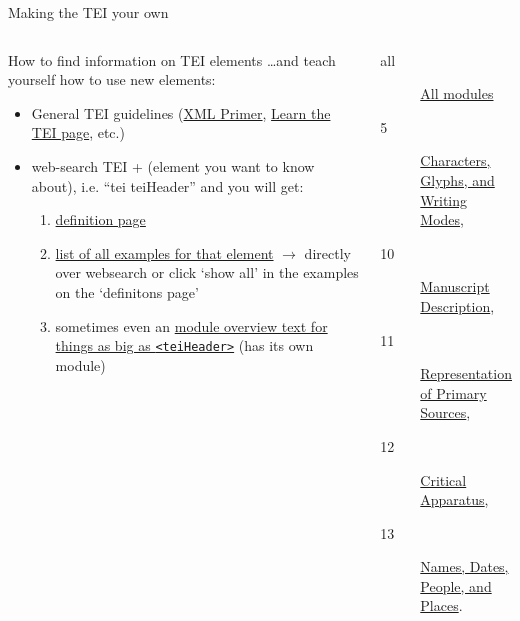 \begin{frame}{Making the TEI your own}
\small
{}

\begin{columns}
    \begin{block}{How to find information on TEI elements}
    \dots and teach yourself how to use new elements:
\begin{itemize}
    \item General TEI guidelines (\href{https://tei-c.org/release/doc/tei-p5-doc/en/html/SG.html}{XML Primer}, \href{https://tei-c.org/support/learn/}{Learn the TEI page}, etc.)
    \item web-search TEI + (element you want to know about), i.e. ``tei teiHeader'' and you will get:
    \begin{enumerate}\footnotesize
        \item \href{https://www.tei-c.org/release/doc/tei-p5-doc/en/html/ref-teiHeader.html}{definition page}
        \item \href{https://www.tei-c.org/release/doc/tei-p5-doc/en/html/examples-teiHeader.html}{list of all examples for that element} $\to$ directly over websearch or click `show all' in the examples on the `definitons page'
        \item sometimes even an \href{https://www.tei-c.org/release/doc/tei-p5-doc/en/html/HD.html}{module overview text for things as big as \texttt{<teiHeader>}} (has its own module)
    \end{enumerate}
\end{itemize}
    \end{block}



\begin{block}{}
\footnotesize
\begin{description}
    \item[all] \href{https://tei-c.org/release/doc/tei-p5-doc/en/html/index.html}{All modules}
     \item[5] \href{https://tei-c.org/release/doc/tei-p5-doc/en/html/WD.html}{Characters, Glyphs, and Writing Modes}, 
     \item[10] \href{https://www.tei-c.org/release/doc/tei-p5-doc/en/html/MS.html}{Manuscript Description},
     \item[11] \href{https://tei-c.org/release/doc/tei-p5-doc/en/html/PH.html}{Representation of Primary Sources},
     \item[12] \href{https://tei-c.org/release/doc/tei-p5-doc/en/html/TC.html}{Critical Apparatus},
     \item[13] \href{https://tei-c.org/release/doc/tei-p5-doc/en/html/ND.html}{Names, Dates, People, and Places}.
\end{description}


\end{block}
\end{columns}
\end{frame}
